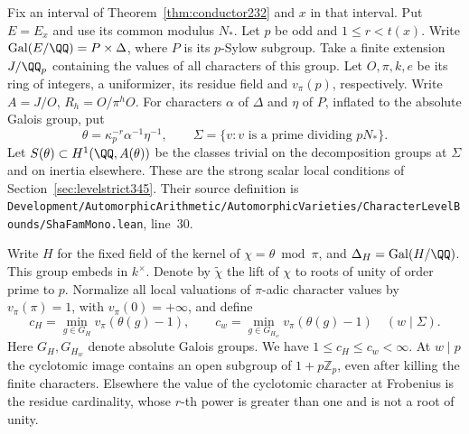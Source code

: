 \documentclass[a4paper,11pt]{article}
\theoremstyle{definition}
\theoremstyle{remark}
\newcommand{\ZZ}{\mathbb Z}\newcommand{\ord}{\operatorname{ord}}
\newcommand{\srcloc}[2]{{\small\nolinkurl{#1.lean}}, line~#2}
\numberwithin{equation}{section}
\begin{document}
Fix an interval of Theorem~\ref{thm:conductor232} and \(x\) in
that interval. Put \(E=E_x\) and use its common modulus \(N_*\).
Let \(p\) be odd and \(1\le r<t(x)\). Write
\(\operatorname{Gal}(E/\QQ)=P\times\Delta\), where \(P\) is its
\(p\)-Sylow subgroup. Take a finite extension \(J/\QQ_p\) containing
the values of all characters of this group. Let \(O,\pi,k,e\)
be its ring of integers, a uniformizer, its residue field and
\(v_\pi(p)\), respectively. Write \(A=J/O\), \(R_h=O/\pi^hO\).
For characters \(\alpha\) of \(\Delta\) and \(\eta\) of \(P\),
inflated to the absolute Galois group, put
\[
        \theta=\kappa_p^{-r}\alpha^{-1}\eta^{-1},
        \qquad \Sigma=\{v:v\text{ is a prime dividing }pN_*\}.
\]
Let \(S(\theta)\subset H^1(\QQ,A(\theta))\) be the classes
trivial on the decomposition groups at \(\Sigma\) and on inertia
elsewhere. These are the strong scalar local conditions of
Section~\ref{sec:levelstrict345}. Their source definition is
\srcloc{Development/AutomorphicArithmetic/AutomorphicVarieties/CharacterLevelBounds/ShaFamMono}{30}.

Write \(H\) for the fixed field of the kernel of
\(\chi=\theta\bmod\pi\), and \(\Delta_H=\operatorname{Gal}(H/\QQ)\).
This group embeds in \(k^\times\). Denote by \(\widetilde\chi\)
the lift of \(\chi\) to roots of unity of order prime to \(p\).
Normalize all local valuations of \(\pi\)-adic character values
by \(v_\pi(\pi)=1\), with \(v_\pi(0)=+\infty\), and define
\[
 c_H=\min_{g\in G_H}v_\pi(\theta(g)-1),\qquad
 c_w=\min_{g\in G_{H_w}}v_\pi(\theta(g)-1)\quad(w\mid\Sigma).
\]
Here \(G_H,G_{H_w}\) denote absolute Galois groups. We have
\(1\le c_H\le c_w<\infty\). At \(w\mid p\) the cyclotomic
image contains an open subgroup of \(1+p\ZZ_p\), even after
killing the finite characters. Elsewhere the value of the
cyclotomic character at Frobenius is the residue cardinality,
whose \(r\)-th power is greater than one and is not a root of unity.
\end{document}
